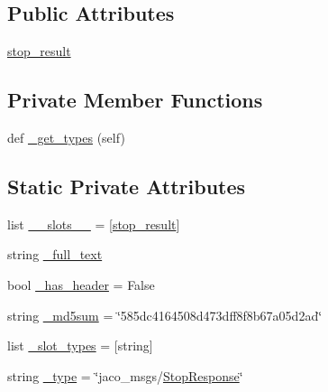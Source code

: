 \subsection*{Public Attributes}
\begin{DoxyCompactItemize}
\item 
\hyperlink{classjaco__msgs_1_1srv_1_1__Stop_1_1StopResponse_ae2263a254672fbbe4d311a1cc5cf56cc}{stop\+\_\+result}
\end{DoxyCompactItemize}
\subsection*{Private Member Functions}
\begin{DoxyCompactItemize}
\item 
def \hyperlink{classjaco__msgs_1_1srv_1_1__Stop_1_1StopResponse_a87c99ab61f7d3e0fe6da4e13294cb790}{\+\_\+get\+\_\+types} (self)
\end{DoxyCompactItemize}
\subsection*{Static Private Attributes}
\begin{DoxyCompactItemize}
\item 
list \hyperlink{classjaco__msgs_1_1srv_1_1__Stop_1_1StopResponse_ac58dce5c67c6e7bd3163dd57f0fad8bd}{\+\_\+\+\_\+slots\+\_\+\+\_\+} = \mbox{[}\textquotesingle{}\hyperlink{classjaco__msgs_1_1srv_1_1__Stop_1_1StopResponse_ae2263a254672fbbe4d311a1cc5cf56cc}{stop\+\_\+result}\textquotesingle{}\mbox{]}
\item 
string \hyperlink{classjaco__msgs_1_1srv_1_1__Stop_1_1StopResponse_ac8863c97bcb6456518b562765aa3229a}{\+\_\+full\+\_\+text}
\item 
bool \hyperlink{classjaco__msgs_1_1srv_1_1__Stop_1_1StopResponse_a132c6a734ba699fbbfdf360395845fbd}{\+\_\+has\+\_\+header} = False
\item 
string \hyperlink{classjaco__msgs_1_1srv_1_1__Stop_1_1StopResponse_a59f34d582a9200b9a18e987e67ffea91}{\+\_\+md5sum} = \char`\"{}585dc4164508d473dff8f8b67a05d2ad\char`\"{}
\item 
list \hyperlink{classjaco__msgs_1_1srv_1_1__Stop_1_1StopResponse_a4a5d8d79daf62c3900247c1d3ff26bf7}{\+\_\+slot\+\_\+types} = \mbox{[}\textquotesingle{}string\textquotesingle{}\mbox{]}
\item 
string \hyperlink{classjaco__msgs_1_1srv_1_1__Stop_1_1StopResponse_aaa032d40f9b684bdde7134dccfa89729}{\+\_\+type} = \char`\"{}jaco\+\_\+msgs/\hyperlink{classjaco__msgs_1_1srv_1_1__Stop_1_1StopResponse}{Stop\+Response}\char`\"{}
\end{DoxyCompactItemize}


